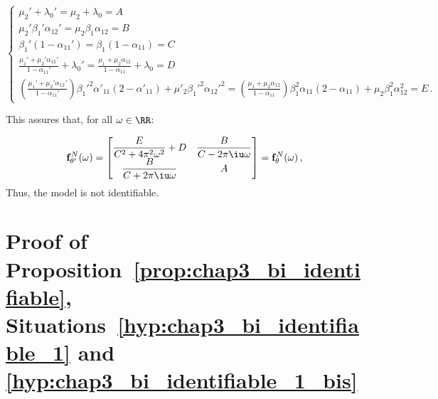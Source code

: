 \begin{subappendices}
\begin{itemize}
\begin{equation*}
\begin{cases}
  \mu_2' + \lambda_0' = \mu_2 + \lambda_0 = A\\
   \mu_2' \beta_1' \alpha_{12}' = \mu_2 \beta_1 \alpha_{12} = B\\
  \beta_1' (1-\alpha_{11}') = \beta_1 (1-\alpha_{11}) = C\\
  \frac{\mu_1' + \mu_2' \alpha_{12}'}{1-\alpha_{11}'} + \lambda_0' = \frac{\mu_1 + \mu_2 \alpha_{12}}{1-\alpha_{11}} + \lambda_0 = D\\
  \left(\frac{\mu_1' + \mu_2' \alpha_{12}'}{1-\alpha_{11}'} \right) {\beta_1'}^2 \alpha'_{11} (2-\alpha'_{11}) + \mu'_2 {\beta_1'}^2 {\alpha_{12}'}^2 = \left(\frac{\mu_1 + \mu_2 \alpha_{12}}{1-\alpha_{11}} \right) \beta_1^2 \alpha_{11} (2-\alpha_{11}) + \mu_2 \beta_1^2 \alpha_{12}^2 = E\,.
\end{cases}
\end{equation*}

This assures that, for all $\omega \in \RR$:

\[
\mathbf{f}_{\theta'}^N(\omega) = \begin{bmatrix}
  \dfrac{E}{C^2 + 4 \pi^2 \omega^2} + D & \dfrac{B}{C - 2 \pi \iu \omega}\\
  \dfrac{B}{C + 2 \pi \iu \omega} & A
\end{bmatrix} 
= \mathbf{f}_{\theta}^N(\omega) \,,
\]
Thus, the model is not identifiable.
\end{itemize}










\section{Proof of Proposition~\ref{prop:chap3_bi_identifiable}, Situations~\ref{hyp:chap3_bi_identifiable_1} and \ref{hyp:chap3_bi_identifiable_1_bis}}\label{appendix:chap3_bi_identifiable_1}


\end{subappendices}
